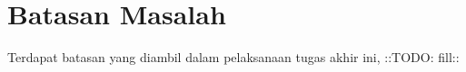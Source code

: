 \section{Batasan Masalah}
\label{sec:batasan-masalah}

Terdapat batasan yang diambil dalam pelaksanaan tugas akhir ini, ::TODO: fill::